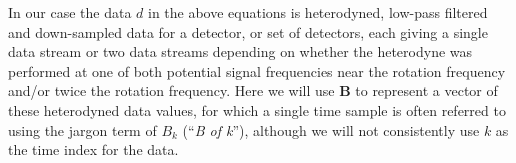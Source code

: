 In our case the data $d$ in the above equations is heterodyned, low-pass filtered and down-sampled data
for a detector, or set of detectors, each giving a single data stream or two data streams depending on
whether the heterodyne was performed at one of both potential signal frequencies near the rotation frequency
and/or twice the rotation frequency. Here we will use $\mathbf{B}$ to represent a vector of these heterodyned
data values, for which a single time sample is often referred to using the jargon term of $B_k$ (``{\it B of k}''), although we will
not consistently use $k$ as the time index for the data.

  
  